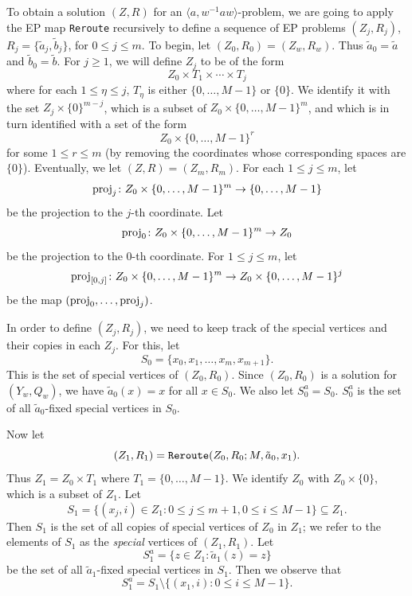 \documentclass[11pt]{amsart}
\theoremstyle{definition}
\theoremstyle{definition}
\numberwithin{equation}{section}
\begin{document}
To obtain a solution $(Z, R)$ for an $\langle a, w^{-1}aw\rangle$-problem, we are going to apply the EP map {\tt Reroute} recursively to define a sequence of EP problems $(Z_j, R_j)$, $R_j=\{\tilde{a}_j, \tilde{b}_j\}$, for $0\leq j\leq m$. To begin, let $(Z_0, R_0)=(Z_w, R_w)$. Thus $\tilde{a}_0=\tilde{a}$ and $\tilde{b}_0=\tilde{b}$. For $j\geq 1$, we will define $Z_j$ to be of the form
$$ Z_0\times T_1\times \cdots \times T_j $$
where for each $1\leq\eta\leq j$, $T_\eta$ is either $\{0, \dots, M-1\}$ or $\{0\}$. We identify it with the set $Z_j\times \{0\}^{m-j}$, which is a subset of $Z_0\times \{0, \dots, M-1\}^m$, and which is in turn identified with a set of the form
$$ Z_0\times \{0, \dots, M-1\}^r $$
for some $1\leq r\leq m$ (by removing the coordinates whose corresponding spaces are $\{0\}$). 
Eventually, we let $(Z, R)=(Z_m, R_m)$. For each $1\leq j\leq m$, let $$\mbox{\rm proj}_j\colon Z_0\times \{0, \dots, M-1\}^m\to \{0, \dots, M-1\}$$ be the projection to the $j$-th coordinate. Let $$\mbox{\rm proj}_0\colon Z_0\times \{0, \dots, M-1\}^m\to Z_0$$ be the projection to the $0$-th coordinate. For $1\leq j\leq m$, let
$$ \mbox{\rm proj}_{[0,j]}\colon Z_0\times \{0, \dots, M-1\}^m\to Z_0\times \{0, \dots, M-1\}^j $$
be the map $(\mbox{\rm proj}_0, \dots, \mbox{\rm proj}_{j})$.

In order to define $(Z_j, R_j)$, we need to keep track of the special vertices and their copies in each $Z_j$. For this, let 
$$ S_0=\{x_0, x_1, \dots, x_m, x_{m+1}\}. $$
This is the set of special vertices of $(Z_0, R_0)$. Since $(Z_0, R_0)$ is a solution for $(Y_w, Q_w)$, we have $\tilde{a}_0(x)=x$ for all $x\in S_0$. We also let $S_0^a=S_0$. $S_0^a$ is the set of all $\tilde{a}_0$-fixed special vertices in $S_0$. 

Now let 
$$ (Z_1, R_1)=\mbox{\tt Reroute}(Z_0, R_0; M, \tilde{a}_0, x_1). $$
Thus $Z_1=Z_0\times T_1$ where $T_1=\{0, \dots, M-1\}$. We identify $Z_0$ with $Z_0\times\{0\}$, which is a subset of $Z_1$. 
Let 
$$ S_1=\{(x_j, i)\in Z_1\colon 0\leq j\leq m+1, 0\leq i\leq M-1\}\subseteq Z_1. $$
Then $S_1$ is the set of all copies of special vertices of $Z_0$ in $Z_1$; we refer to the elements of $S_1$ as the {\em special} vertices of $(Z_1, R_1)$. Let 
$$ S_1^a=\{z\in Z_1\colon \tilde{a}_1(z)=z\} $$
be the set of all $\tilde{a}_1$-fixed special vertices in $S_1$. Then we observe that
$$ S_1^a=S_1\setminus \{(x_1,i)\colon 0\leq i\leq M-1\}. $$
\end{document}

